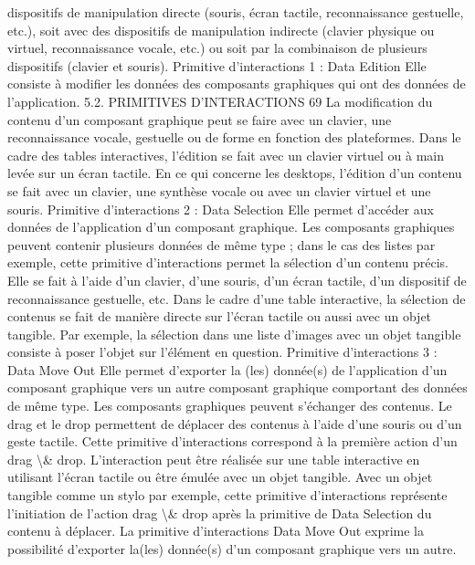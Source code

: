 \documentclass{article}
\begin{document}
dispositifs de manipulation directe (souris, \'{e}cran tactile, reconnaissance gestuelle, etc.), soit avec des
dispositifs de manipulation indirecte (clavier physique ou virtuel, reconnaissance vocale, etc.) ou soit
par la combinaison de plusieurs dispositifs (clavier et souris).
Primitive d’interactions 1 : Data Edition
Elle consiste \`{a} modiﬁer les donn\'{e}es des composants graphiques qui ont des
donn\'{e}es de l’application.
5.2. PRIMITIVES D’INTERACTIONS
69
La modiﬁcation du contenu d’un composant graphique peut se faire avec un clavier, une reconnaissance vocale, gestuelle ou de forme en fonction des plateformes. Dans le cadre des tables interactives,
l’\'{e}dition se fait avec un clavier virtuel ou \`{a} main lev\'{e}e sur un \'{e}cran tactile. En ce qui concerne les
desktops, l’\'{e}dition d’un contenu se fait avec un clavier, une synth\`{e}se vocale ou avec un clavier virtuel
et une souris.
Primitive d’interactions 2 : Data Selection
Elle permet d’acc\'{e}der aux donn\'{e}es de l’application d’un composant graphique.
Les composants graphiques peuvent contenir plusieurs donn\'{e}es de m\^{e}me type ; dans le cas des listes
par exemple, cette primitive d’interactions permet la s\'{e}lection d’un contenu pr\'{e}cis. Elle se fait \`{a}
l’aide d’un clavier, d’une souris, d’un \'{e}cran tactile, d’un dispositif de reconnaissance gestuelle, etc.
Dans le cadre d’une table interactive, la s\'{e}lection de contenus se fait de mani\`{e}re directe sur l’\'{e}cran
tactile ou aussi avec un objet tangible. Par exemple, la s\'{e}lection dans une liste d’images avec un objet
tangible consiste \`{a} poser l’objet sur l’\'{e}l\'{e}ment en question.
Primitive d’interactions 3 : Data Move Out
Elle permet d’exporter la (les) donn\'{e}e(s) de l’application d’un composant
graphique vers un autre composant graphique comportant des donn\'{e}es de m\^{e}me
type.
Les composants graphiques peuvent s’\'{e}changer des contenus. Le drag et le drop permettent de
d\'{e}placer des contenus \`{a} l’aide d’une souris ou d’un geste tactile. Cette primitive d’interactions
correspond \`{a} la premi\`{e}re action d’un drag \textbackslash{}& drop. L’interaction peut \^{e}tre r\'{e}alis\'{e}e sur une table
interactive en utilisant l’\'{e}cran tactile ou \^{e}tre \'{e}mul\'{e}e avec un objet tangible. Avec un objet tangible
comme un stylo par exemple, cette primitive d’interactions repr\'{e}sente l’initiation de l’action drag \textbackslash{}&
drop apr\`{e}s la primitive de Data Selection du contenu \`{a} d\'{e}placer. La primitive d’interactions Data
Move Out exprime la possibilit\'{e} d’exporter la(les) donn\'{e}e(s) d’un composant graphique vers un autre.
\end{document}
